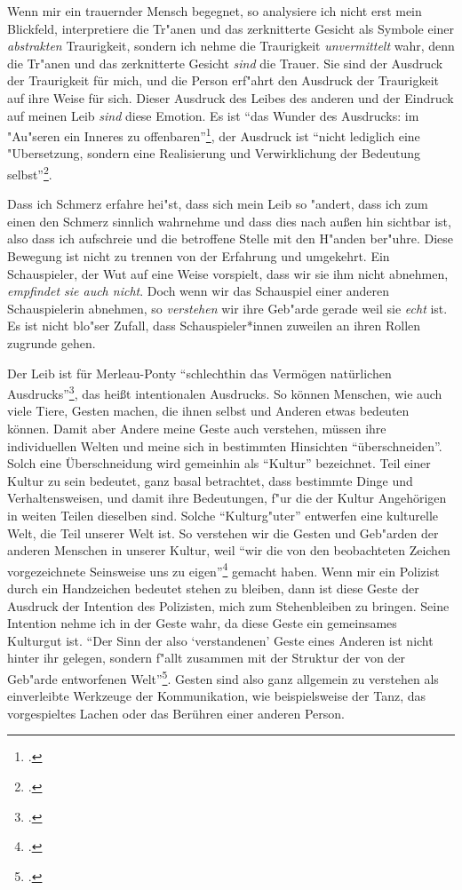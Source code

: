\documentclass[a4paper, 12pt]{article}
\begin{document}
\begin{onehalfspace}
Wenn mir ein trauernder Mensch begegnet, so analysiere ich nicht erst mein Blickfeld, interpretiere die Tr"anen und das zerknitterte Gesicht als Symbole einer \emph{abstrakten} Traurigkeit, sondern ich nehme die Traurigkeit \emph{unvermittelt} wahr, denn die Tr"anen und das zerknitterte Gesicht \emph{sind} die Trauer. Sie sind der Ausdruck der Traurigkeit für mich, und die Person erf"ahrt den Ausdruck der Traurigkeit auf ihre Weise für sich. Dieser Ausdruck des Leibes des anderen und der Eindruck auf meinen Leib \emph{sind} diese Emotion. Es ist "`das Wunder des Ausdrucks: im "Au"seren ein Inneres zu offenbaren"'\footnote{\Cite[Siehe][S. 370]{merleau1966phanomenologie}.}, der Ausdruck ist "`nicht lediglich eine "Ubersetzung, sondern eine Realisierung und Verwirklichung der Bedeutung selbst"'\footnote{\Cite[Siehe][S. 217]{merleau1966phanomenologie}.}. 

Dass ich Schmerz erfahre hei"st, dass sich mein Leib so "andert, dass ich zum einen den Schmerz sinnlich wahrnehme und dass dies nach außen hin sichtbar ist, also dass ich aufschreie und die betroffene Stelle mit den H"anden ber"uhre. Diese Bewegung ist nicht zu trennen von der Erfahrung und umgekehrt. Ein Schauspieler, der Wut auf eine Weise vorspielt, dass wir sie ihm nicht abnehmen, \emph{empfindet sie auch nicht}. Doch wenn wir das Schauspiel einer anderen Schauspielerin abnehmen, so \emph{verstehen} wir ihre Geb"arde gerade weil sie \emph{echt} ist. Es ist nicht blo"ser Zufall, dass Schauspieler*innen zuweilen an ihren Rollen zugrunde gehen. 

Der Leib ist für Merleau-Ponty "`schlechthin das Vermögen natürlichen Ausdrucks"'\footnote{\Cite[Siehe][S. 215]{merleau1966phanomenologie}.}, das heißt intentionalen Ausdrucks. So können Menschen, wie auch viele Tiere, Gesten machen, die ihnen selbst und Anderen etwas bedeuten können. Damit aber Andere meine Geste auch verstehen, müssen ihre individuellen Welten und meine sich in bestimmten Hinsichten "`überschneiden"'. Solch eine Überschneidung wird gemeinhin als "`Kultur"' bezeichnet. Teil einer Kultur zu sein bedeutet, ganz basal betrachtet, dass bestimmte Dinge und Verhaltensweisen, und damit ihre Bedeutungen, f"ur die der Kultur Angehörigen in weiten Teilen dieselben sind. Solche "`Kulturg"uter"' entwerfen eine kulturelle Welt, die Teil unserer Welt ist. So verstehen wir die Gesten und Geb"arden der anderen Menschen in unserer Kultur, weil "`wir die von den beobachteten Zeichen vorgezeichnete Seinsweise uns zu eigen"'\footnote{\Cite[Siehe][S. 370]{merleau1966phanomenologie}.} gemacht haben. Wenn mir ein Polizist durch ein Handzeichen bedeutet stehen zu bleiben, dann ist diese Geste der Ausdruck der Intention des Polizisten, mich zum Stehenbleiben zu bringen. Seine Intention nehme ich in der Geste wahr, da diese Geste ein gemeinsames Kulturgut ist. "`Der Sinn der also `verstandenen' Geste eines Anderen ist nicht hinter ihr gelegen, sondern f"allt zusammen mit der Struktur der von der Geb"arde entworfenen Welt"'\footnote{\Cite[Siehe][S. 220]{merleau1966phanomenologie}.}. Gesten sind also ganz allgemein zu verstehen als einverleibte Werkzeuge der Kommunikation, wie beispielsweise der Tanz, das vorgespieltes Lachen oder das Berühren einer anderen Person.


\end{onehalfspace}
\end{document}

